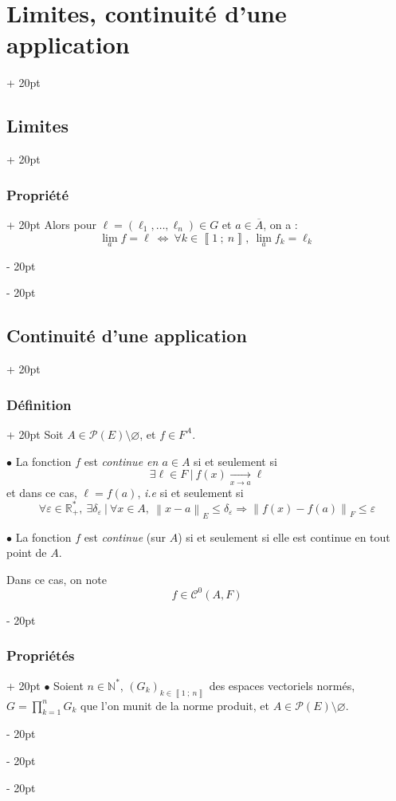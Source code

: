 \documentclass[a4paper, 12pt, twoside]{article}
\newcommand{\N}{\mathbb{N}} %
\newcommand{\R}{\mathbb{R}} %
\newcommand{\nset}[2]{\left\llbracket #1\ ;\ #2 \right\rrbracket}
\newcommand{\cj}[1]{\overline{#1}} %
\newcommand{\tendsto}[1]{\xrightarrow[#1]{}}
\newcommand{\norm}[1]{\left\lVert #1 \right\rVert}
\newcommand{\ssi}{\ \Leftrightarrow \ }
\renewcommand{\le}{\leqslant}
\newcommand{\ind}[1][20pt]{\advance\leftskip + #1}
\newcommand{\deind}[1][20pt]{\advance\leftskip - #1}
\newenvironment{indt}[2][20pt]{#2 \par \ind[#1]}{\par \deind} %
\begin{document}
\begin{indt}{\section{Limites, continuité d'une application}}
\begin{indt}{\subsection{Limites}}
\begin{indt}{\subsubsection{Propriété}}
                Alors pour $\ell = (\ell_1, \ldots, \ell_n) \in G$ et $a \in \cj A$, on a :
                \[
                    \lim_a f = \ell
                    \ssi
                    \forall k \in \nset 1 n,\
                    \lim_a f_k = \ell_k
                \]
            \end{indt}
        \end{indt}

        \vspace{12pt}
        
        \begin{indt}{\subsection{Continuité d'une application}}
            \begin{indt}{\subsubsection{Définition}}
                Soit $A \in \mathcal P(E) \setminus \varnothing$, et $f \in F^A$.

                \vspace{6pt}
                
                $\bullet$ La fonction $f$ est \emph{continue en $a \in A$} si et seulement si
                \[
                    \exists \ell \in F\ |\ f(x) \tendsto{x \to a} \ell
                \]
                et dans ce cas, $\ell = f(a)$, \textit{i.e} si et seulement si
                \[
                    \forall \varepsilon \in \R^*_+,\
                    \exists \delta_\varepsilon\ |\
                    \forall x \in A,\
                    \norm{x - a}_E \le \delta_\varepsilon \Rightarrow \norm{f(x) - f(a)}_F \le \varepsilon
                \]

                \vspace{6pt}
                
                $\bullet$ La fonction $f$ est \emph{continue} (sur $A$) si et seulement si elle est continue en tout point de $A$.

                Dans ce cas, on note
                \[
                    f \in \mathcal C^0(A, F)
                \]
            \end{indt}

            \vspace{12pt}
            
            \begin{indt}{\subsubsection{Propriétés}}
                $\bullet$ Soient $n \in \N^*$, $(G_k)_{k \in \nset 1 n}$ des espaces vectoriels normés, $\displaystyle G = \prod_{k = 1}^n G_k$ que l'on munit de la norme produit, et $A \in \mathcal P(E) \setminus \varnothing$.


\end{indt}
\end{indt}
\end{indt}
\end{document}

